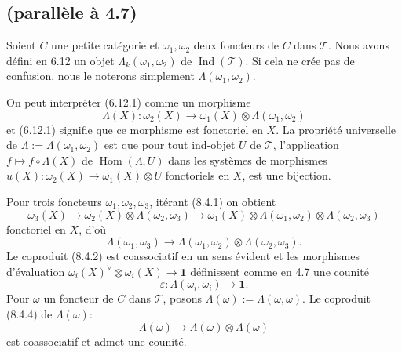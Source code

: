 \documentclass[12pt,a4paper]{article}
\theoremstyle{plain}
\theoremstyle{definition}
\DeclareMathOperator{\Hom}{Hom}
\DeclareMathOperator{\Ind}{Ind}
\begin{document}
\subsection{(parallèle à 4.7)}

Soient $C$ une petite catégorie et $\omega_1, \omega_2$ deux foncteurs de $C$ dans $\mathcal{T}$. Nous avons défini en 6.12 un objet $\Lambda_k(\omega_1, \omega_2)$ de $\Ind(\mathcal{T})$. Si cela ne crée pas de confusion, nous le noterons simplement $\Lambda(\omega_1, \omega_2)$.

On peut interpréter (6.12.1) comme un morphisme
\begin{equation}\label{eq:8.4.1}
\Lambda(X) : \omega_2(X) \to \omega_1(X) \otimes \Lambda(\omega_1, \omega_2)
\end{equation}
et (6.12.1) signifie que ce morphisme est fonctoriel en $X$. La propriété universelle de $\Lambda := \Lambda(\omega_1, \omega_2)$ est que pour tout ind-objet $U$ de $\mathcal{T}$, l'application $f \mapsto f \circ \Lambda(X)$ de $\Hom(\Lambda, U)$ dans les systèmes de morphismes $u(X) : \omega_2(X) \to \omega_1(X) \otimes U$ fonctoriels en $X$, est une bijection.

Pour trois foncteurs $\omega_1, \omega_2, \omega_3$, itérant (8.4.1) on obtient
\[
\omega_3(X) \to \omega_2(X) \otimes \Lambda(\omega_2, \omega_3) \to \omega_1(X) \otimes \Lambda(\omega_1, \omega_2) \otimes \Lambda(\omega_2, \omega_3)
\]
fonctoriel en $X$, d'où
\begin{equation}\label{eq:8.4.2}
\Lambda(\omega_1, \omega_3) \to \Lambda(\omega_1, \omega_2) \otimes \Lambda(\omega_2, \omega_3).
\end{equation}
Le coproduit (8.4.2) est coassociatif en un sens évident et les morphismes d'évaluation $\omega_i(X)^\vee \otimes \omega_i(X) \to \mathbf{1}$ définissent comme en 4.7 une counité
\[
\varepsilon : \Lambda(\omega_i, \omega_i) \to \mathbf{1}.
\]
Pour $\omega$ un foncteur de $C$ dans $\mathcal{T}$, posons $\Lambda(\omega) := \Lambda(\omega, \omega)$. Le coproduit (8.4.4) de $\Lambda(\omega)$:
\begin{equation}\label{eq:8.4.3}
\Lambda(\omega) \to \Lambda(\omega) \otimes \Lambda(\omega)
\end{equation}
est coassociatif et admet une counité.
\end{document}
